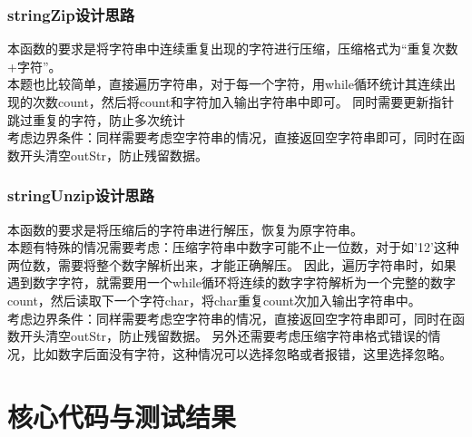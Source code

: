 \documentclass[dvipsnames, svgnames,a4paper,11pt]{article}
\begin{document}
\subsubsection{stringZip设计思路}
本函数的要求是将字符串中连续重复出现的字符进行压缩，压缩格式为“重复次数+字符”。\\
本题也比较简单，直接遍历字符串，对于每一个字符，用while循环统计其连续出现的次数count，然后将count和字符加入输出字符串中即可。
同时需要更新指针跳过重复的字符，防止多次统计\\
考虑边界条件：同样需要考虑空字符串的情况，直接返回空字符串即可，同时在函数开头清空outStr，防止残留数据。
\subsubsection{stringUnzip设计思路}
本函数的要求是将压缩后的字符串进行解压，恢复为原字符串。\\
本题有特殊的情况需要考虑：压缩字符串中数字可能不止一位数，对于如'12'这种两位数，需要将整个数字解析出来，才能正确解压。
因此，遍历字符串时，如果遇到数字字符，就需要用一个while循环将连续的数字字符解析为一个完整的数字count，然后读取下一个字符char，将char重复count次加入输出字符串中。\\
考虑边界条件：同样需要考虑空字符串的情况，直接返回空字符串即可，同时在函数开头清空outStr，防止残留数据。
另外还需要考虑压缩字符串格式错误的情况，比如数字后面没有字符，这种情况可以选择忽略或者报错，这里选择忽略。
\section{核心代码与测试结果}
\end{document}
